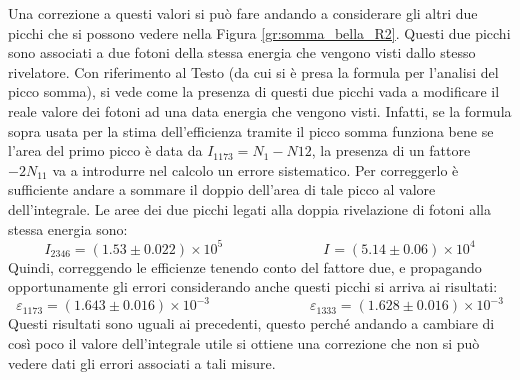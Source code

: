 Una correzione a questi valori si può fare andando a considerare gli altri due picchi che si possono vedere nella Figura \ref{gr:somma_bella_R2}. Questi due picchi sono
associati a due fotoni della stessa energia che vengono visti dallo stesso rivelatore. Con riferimento al Testo \cite{bib:knoll} (da cui si è presa la formula per l'analisi
del picco somma), si vede come la presenza di questi due picchi vada a modificare il reale valore dei fotoni ad una data energia che vengono visti. Infatti, se la formula
sopra usata per la stima dell'efficienza tramite il picco somma funziona bene se l'area del primo picco è data da $I_{1173}=N_{1}-N{12}$, la presenza di un fattore
$-2N_{11}$ va a introdurre nel calcolo un errore sistematico. Per correggerlo è sufficiente andare a sommare il doppio dell'area di tale picco al valore dell'integrale.
Le aree dei due picchi legati alla doppia rivelazione di fotoni alla stessa energia sono:
$$I_{2346} = (1.53\pm 0.022)\times 10^5 \hspace{3cm} I_{} = (5.14 \pm 0.06)\times 10^4 $$
Quindi, correggendo le efficienze tenendo conto del fattore due, e propagando opportunamente gli errori considerando anche questi picchi si arriva ai risultati:
$$\varepsilon_{1173}=(1.643 \pm 0.016)\times 10^{-3} \hspace{3cm} \varepsilon_{1333}=(1.628 \pm 0.016)\times 10^{-3}$$
Questi risultati sono uguali ai precedenti, questo perché andando a cambiare di così poco il valore dell'integrale utile si ottiene una correzione che non si può vedere dati
gli errori associati a tali misure.
